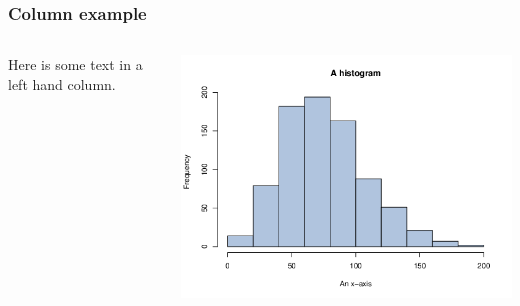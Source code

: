 \documentclass[compress]{beamer}
\begin{document}
\begin{frame}
\frametitle{Column example}
\begin{columns}
\begin{column}{0.6\textwidth}
   Here is some text in a left hand column.
\end{column}
\begin{column}{0.4\textwidth}
     \includegraphics[width=\textwidth]{images/image.png}
\end{column}
\end{columns}
\end{frame}
\end{document}
